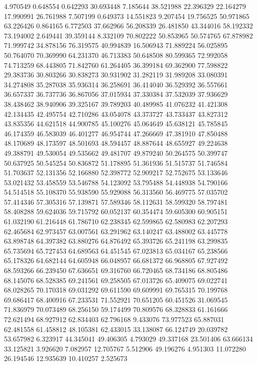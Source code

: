 4.970549
0.648554
0.642293
30.693448
7.185644
38.521988
22.396329
22.164279
17.990991
26.761988
7.507199
0.649373
14.551823
9.207454
19.756525
50.971865
63.226426
0.864165
6.772503
37.662966
56.208339
26.481850
43.344016
58.192332
73.194002
2.649441
39.359144
8.332109
70.802222
50.853965
50.574765
67.878982
71.999742
34.878156
76.319575
40.994839
16.506943
71.889224
56.025895
50.764070
70.369990
64.231370
46.713383
50.648508
80.599365
72.992058
74.713259
68.443805
71.842760
61.264405
36.399184
69.362900
77.598822
29.383736
30.803266
30.838273
30.931902
31.282119
31.989208
33.080391
34.274808
35.287038
35.936314
36.258691
36.414040
36.529392
36.557661
36.657337
36.737736
36.867056
37.015934
37.330384
37.532039
37.936629
38.438462
38.940906
39.325167
39.789203
40.489985
41.076232
41.421308
42.134435
42.495754
42.710286
43.054078
43.373727
43.733437
43.827312
43.835356
44.621518
44.900785
45.100276
45.064649
45.638121
45.785845
46.174359
46.583039
46.401277
46.954744
47.266669
47.381910
47.850488
48.170689
48.173597
48.501693
48.594457
48.887644
48.655927
49.224638
49.388791
49.530054
49.535662
49.481707
49.879240
50.264575
50.399747
50.637925
50.545254
50.836872
51.178895
51.361936
51.515737
51.746584
51.703637
52.131356
52.166880
52.398772
52.909217
52.752675
53.133646
53.021432
53.458559
53.546788
54.123092
53.795488
54.448938
54.790166
54.514518
55.108370
55.938590
55.929088
56.313560
56.469775
57.035702
57.414346
57.305316
57.139871
57.589346
58.112631
58.599320
58.797481
58.408288
59.624036
59.715792
60.052137
60.354474
59.605300
60.905151
61.032190
61.216448
61.786710
62.238345
62.599865
62.580983
62.207293
62.465684
62.973457
63.007561
63.291962
63.140247
63.488002
63.445778
63.898748
64.397382
63.880276
64.876492
65.393726
65.241198
63.299835
65.735694
65.727453
64.689563
64.451545
67.023813
65.034167
65.238566
65.178326
64.682144
64.605948
66.048957
66.681372
66.968805
67.927492
68.593266
66.239450
67.636651
69.316760
66.720465
68.734186
68.805486
68.145076
68.528385
69.241561
69.258505
67.013726
65.409075
69.022741
68.028265
70.170318
69.031292
69.611590
69.609991
69.765315
70.199768
69.686417
68.400916
67.233531
71.552921
70.651205
60.451526
31.069545
71.836979
70.073489
68.256150
59.174499
70.809576
68.328833
61.161666
72.621494
68.927912
62.834403
62.796168
9.433076
73.977523
65.887031
62.481558
61.458812
48.105381
62.433015
33.138087
66.124749
20.039782
53.657982
6.323917
44.345041
49.406305
4.793029
49.337168
23.501406
63.666134
33.125821
3.926620
7.082957
12.705767
5.512906
49.196276
4.951303
11.072280
26.194546
12.935639
10.410257
2.525673
